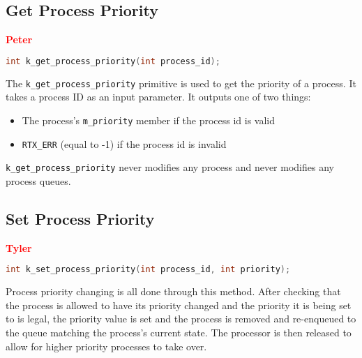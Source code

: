 \documentclass[12pt]{report}
\begin{document}
\subsection{Get Process Priority}

\textcolor{red}{\textbf{Peter}} \\

\begin{minipage}{\textwidth}
\begin{lstlisting}[language=C, frame=single]
int k_get_process_priority(int process_id);
\end{lstlisting}
\end{minipage}

The {\tt k\_get\_process\_priority} primitive is used to get the priority of a process. It takes a process ID as an input parameter. It outputs one of two things:\\

\begin{itemize}
\item The process's {\tt m\_priority} member if the process id is valid
\item {\tt RTX\_ERR} (equal to -1) if the process id is invalid
\end{itemize}

{\tt k\_get\_process\_priority} never modifies any process and never modifies any process queues.\\

\subsection{Set Process Priority}

\textcolor{red}{\textbf{Tyler}} \\
\begin{minipage}{\textwidth}
\begin{lstlisting}[language=C, frame=single]
int k_set_process_priority(int process_id, int priority);
\end{lstlisting}
\end{minipage}

Process priority changing is all done through this method. After checking that the process is allowed to have its priority changed and the priority it is being set to is legal, the priority value is set and the process is removed and re-enqueued to the queue matching the process's current state. The processor is then released to allow for higher priority processes to take over.

\begin{algorithm}
  \caption{The process priority changing function}
  \begin{algorithmic}[1]
		\EndIf
    \EndProcedure
  \end{algorithmic}
\end{algorithm}
\end{document}
